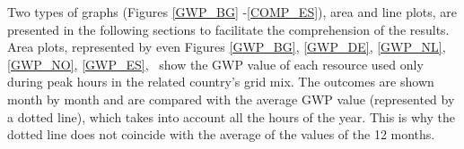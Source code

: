 { \begin{table}[htbp]
\centering
\caption{Emission factors of power production technologies. Extracted from \cite{Turconi2013LifeLimitations}.}
\label{EmissionFactors}
\end{table}



Two types of graphs (Figures \ref{GWP_BG} -\ref{COMP_ES}), area and line plots, are presented in the following sections to facilitate the comprehension of the results. Area plots, represented by even Figures \ref{GWP_BG}, \ref{GWP_DE}, \ref{GWP_NL}, \ref{GWP_NO}, \ref{GWP_ES}, 
~show the GWP value of each resource used only during peak hours in the related country's grid mix. The outcomes are shown month by month and are compared with the average GWP value (represented by a dotted line), which takes into account all the hours of the year. This is why the dotted line does not coincide with the average of the values of the 12 months. %

}
